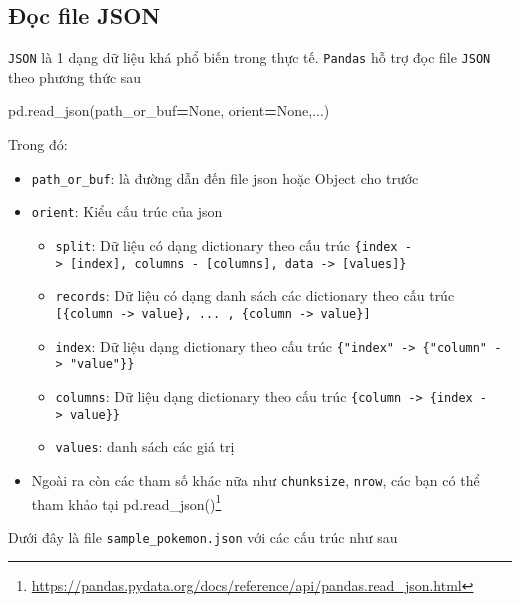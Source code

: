 \documentclass[
]{book}
\newenvironment{Shaded}{\begin{snugshade}}{\end{snugshade}}
\newcommand{\NormalTok}[1]{#1}
\newcommand{\OperatorTok}[1]{\textcolor[rgb]{0.81,0.36,0.00}{\textbf{#1}}}
\newcommand{\VariableTok}[1]{\textcolor[rgb]{0.00,0.00,0.00}{#1}}
\providecommand{\tightlist}{%
  \setlength{\itemsep}{0pt}\setlength{\parskip}{0pt}}
\renewcommand{\href}[2]{#2\footnote{\url{#1}}}
\begin{document}
\subsection{Đọc file JSON}\label{ux111ux1ecdc-file-json}

\texttt{JSON} là 1 dạng dữ liệu khá phổ biến trong thực tế. \texttt{Pandas} hỗ trợ đọc file \texttt{JSON} theo phương thức sau

\begin{Shaded}
\begin{Highlighting}[]
\NormalTok{pd.read\_json(path\_or\_buf}\OperatorTok{=}\VariableTok{None}\NormalTok{, orient}\OperatorTok{=}\VariableTok{None}\NormalTok{,...)}
\end{Highlighting}
\end{Shaded}

Trong đó:

\begin{itemize}
\item
  \texttt{path\_or\_buf}: là đường dẫn đến file json hoặc Object cho trước
\item
  \texttt{orient}: Kiểu cấu trúc của json

  \begin{itemize}
  \tightlist
  \item
    \texttt{split}: Dữ liệu có dạng dictionary theo cấu trúc \texttt{\{index\ -\textgreater{}\ {[}index{]},\ columns\ -\ {[}columns{]},\ data\ -\textgreater{}\ {[}values{]}\}}
  \item
    \texttt{records}: Dữ liệu có dạng danh sách các dictionary theo cấu trúc \texttt{{[}\{column\ -\textgreater{}\ value\},\ ...\ ,\ \{column\ -\textgreater{}\ value\}{]}}
  \item
    \texttt{index}: Dữ liệu dạng dictionary theo cấu trúc \texttt{\{"index"\ -\textgreater{}\ \{"column"\ -\textgreater{}\ "value"\}\}}
  \item
    \texttt{columns}: Dữ liệu dạng dictionary theo cấu trúc \texttt{\{column\ -\textgreater{}\ \{index\ -\textgreater{}\ value\}\}}
  \item
    \texttt{values}: danh sách các giá trị
  \end{itemize}
\item
  Ngoài ra còn các tham số khác nữa như \texttt{chunksize}, \texttt{nrow}, các bạn có thể tham khảo tại \href{https://pandas.pydata.org/docs/reference/api/pandas.read_json.html}{pd.read\_json()}
\end{itemize}

Dưới đây là file \texttt{sample\_pokemon.json} với các cấu trúc như sau
\end{document}
